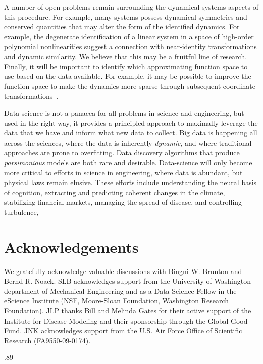 \documentclass[onecolumn,11pt]{article}
\begin{document}
A number of open problems remain surrounding the dynamical systems aspects of this procedure.  For example, many systems possess dynamical symmetries and conserved quantities that may alter the form of the identified dynamics.  For example, the degenerate identification of a linear system in a space of high-order polynomial nonlinearities suggest a connection with near-identity transformations and dynamic similarity.  We believe that this may be a fruitful line of research.  Finally, it will be important to identify which approximating function space to use based on the data available.  For example, it may be possible to improve the function space to make the dynamics more sparse through subsequent coordinate transformations~\cite{guckenheimer_holmes}.

Data science is not a panacea for all problems in science and engineering, but used in the right way, it provides a principled approach to maximally leverage the data that we have and inform what new data to collect.  
Big data is happening all across the sciences, where the data is inherently \emph{dynamic}, and where traditional approaches are prone to overfitting.  
Data discovery algorithms that produce \emph{parsimonious} models are both rare and desirable.
Data-science will only become more critical to efforts in science in engineering, where data is abundant, but physical laws remain elusive.
These efforts include understanding the neural basis of cognition, extracting and predicting coherent changes in the climate, stabilizing financial markets, managing the spread of disease, and controlling turbulence, 







\section*{Acknowledgements}
We gratefully acknowledge valuable discussions with Bingni W. Brunton and Bernd R. Noack.  SLB acknowledges support from the University of Washington department of Mechanical Engineering and as a Data Science Fellow in the eScience Institute (NSF, Moore-Sloan Foundation, Washington Research Foundation).  JLP thanks Bill and Melinda Gates for their active support of the Institute for Disease Modeling and their sponsorship through the Global Good Fund.  JNK acknowledges support from the  U.S. Air Force Office of Scientific Research (FA9550-09-0174).


\newpage
\begin{spacing}{.89}
\footnotesize{


}
\end{spacing}
\end{document}
